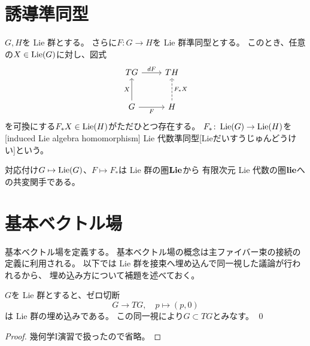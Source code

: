 \documentclass[report]{jlreq}
\begin{document}
\section{誘導準同型}

\begin{definition}[誘導準同型]
    $G, H$を Lie 群とする。
    さらに$F \colon G \to H$を Lie 群準同型とする。
    このとき、任意の$X \in \operatorname{Lie}(G)$に対し、図式
    \begin{equation}
        \begin{tikzcd}[row sep=large]
            TG \ar{r}{dF} & TH \\
            G \ar{u}{X} \ar{r}[swap]{F} & H \ar[dashed]{u}[swap]{F_*X}
        \end{tikzcd}
    \end{equation}
    を可換にする$F_*X \in \operatorname{Lie}(H)$がただひとつ存在する。
    $F_* \colon \operatorname{Lie}(G) \to \operatorname{Lie}(H)$を
    [induced Lie algebra homomorphism]
    {Lie 代数準同型}[Lieだいすうじゅんどうけい]という。
\end{definition}

\begin{remark}
    対応付け$G \mapsto \operatorname{Lie}(G)$、$F \mapsto F_*$は
    Lie 群の圏$\mathbf{Lie}$から
    有限次元 Lie 代数の圏$\mathbf{lie}$への共変関手である。
\end{remark}



%
\section{基本ベクトル場}

基本ベクトル場を定義する。
基本ベクトル場の概念は主ファイバー束の接続の定義に利用される。
以下では Lie 群を接束へ埋め込んで同一視した議論が行われるから、
埋め込み方について補題を述べておく。

\begin{lemma}
    $G$を Lie 群とすると、ゼロ切断
    \begin{equation}
        G \to TG,
        \quad
        p \mapsto (p, 0)
    \end{equation}
    は Lie 群の埋め込みである。
    この同一視により$G \subset TG$とみなす。
    \qed
\end{lemma}

\begin{proof}
    幾何学I演習で扱ったので省略。
\end{proof}
\end{document}

